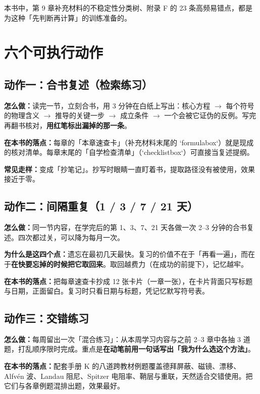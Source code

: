 本书中，第 9 章补充材料的不稳定性分类树、附录 F 的 23 条高频易错点，都是为这种「先判断再计算」的训练准备的。


\section{六个可执行动作}

\subsection{动作一：合书复述（检索练习）}

\textbf{怎么做：}读完一节，立刻合书，用 3 分钟在白纸上写出：核心方程 $\to$ 每个符号的物理含义 $\to$ 推导的关键一步 $\to$ 成立条件 $\to$ 一个会被它证伪的反例。写完再翻书核对，\textbf{用红笔标出漏掉的那一条}。

\textbf{在本书的落点：}每章的「本章速查卡」（补充材料末尾的 `formulabox`）就是现成的核对清单。每章末尾的「自学检查清单」（`checklistbox`）可直接当复述提纲。

\textbf{常见走样：}变成「抄笔记」。抄写时眼睛一直盯着书，提取路径没有被使用，效果接近于零。

\subsection{动作二：间隔重复（1 / 3 / 7 / 21 天）}

\textbf{怎么做：}同一节内容，在学完后的第 1、3、7、21 天各做一次 2--3 分钟的合书复述。四次都过关，可以降为每月一次。

\textbf{为什么是这四个点：}遗忘在最初几天最快。复习的价值不在于「再看一遍」，而在于\textbf{在快要忘掉的时候把它取回来}。取回越费力（在成功的前提下），记忆越牢。

\textbf{在本书的落点：}把每章速查卡抄成 12 张卡片（一章一张），在卡片背面只写标题与日期，正面留白。复习时只看日期与标题，凭记忆默写符号表。

\subsection{动作三：交错练习}

\textbf{怎么做：}每周留出一次「混合练习」：从本周学习内容与之前 2--3 章中各抽 3 道题，打乱顺序限时完成。重点是\textbf{在动笔前用一句话写出「我为什么选这个方法」}。

\textbf{在本书的落点：}配套手册 K 的八道跨教材例题覆盖德拜屏蔽、磁镜、漂移、Alfvén 波、Landau 阻尼、Spitzer 电阻率、鞘层与重联，天然适合交错使用。把它们与各章例题混排出题，效果最好。

